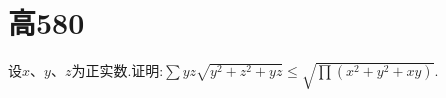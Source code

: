 \documentclass[]{article}
\title{}
\author{}
\date{}
\begin{document}
\maketitle
\section{高580}{
设$\displaystyle x、y、z$为正实数.证明:$\displaystyle\sum yz\sqrt{y^2+z^2+yz}\leq \sqrt{\prod(x^2+y^2+xy)}$.
}
\end{document}
